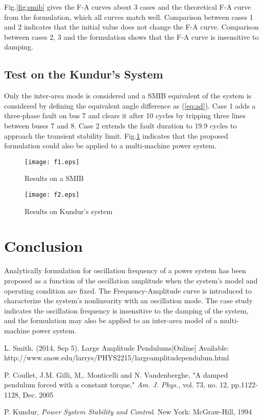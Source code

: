 \documentclass[journal]{IEEEtran}
\begin{document}
Fig.\ref{fig:smib} gives the F-A curves about 3 cases and the theoretical F-A curve from the formulation, which all curves match well. Comparison between cases 1 and 2 indicates that the initial value does not change the F-A curve. Comparison between cases 2, 3 and the formulation shows that the F-A curve is insensitive to damping.

\subsection{Test on the Kundur's System}
Only the inter-area mode is considered and a SMIB equivalent of the system is considered by defining the equivalent angle difference as (\ref{eq:ad}). Case 1 adds a three-phase fault on bus 7 and clears it after 10 cycles by tripping three lines between buses 7 and 8. Case 2 extends the fault duration to 19.9 cycles to approach the transient stability limit. Fig.\ref{fig:kundur} indicates that the proposed formulation could also be applied to a multi-machine power system.

\begin{figure}[htbp]
\begin{minipage}[t]{0.49\linewidth}
\raggedleft
\texttt{[image: f1.eps]}
\caption{Results on a SMIB} \label{fig:smib}
\end{minipage}
\begin{minipage}[t]{0.49\linewidth}
\raggedright
\texttt{[image: f2.eps]}
\caption{Results on Kundur's system} \label{fig:kundur}
\end{minipage}
\end{figure}

\section{Conclusion}
Analytically formulation for oscillation frequency of a power system has been proposed as a function of the oscillation amplitude when the system's model and operating condition are fixed. The Frequency-Amplitude curve is introduced to characterize the system's nonlinearity with an oscillation mode. The case study indicates the oscillation frequency is insensitive to the damping of the system, and the formulation may also be applied to an inter-area model of a multi-machine power system.


\begin{thebibliography}{99}
  L. Smith. (2014, Sep 5). Large Amplitude Pendulums[Online] Available:  http://www.snow.edu/larrys/PHYS2215/largeamplitudependulum.html

 P. Coullet, J.M. Gilli, M,. Monticelli and N. Vandenberghe, "A damped pendulum forced with a constant torque,"
\emph{Am. J. Phys.}, vol. 73, no. 12, pp.1122-1128, Dec. 2005

 P. Kundur,
\emph{Power System Stability and Control}. New York: McGraw-Hill, 1994

\end{thebibliography}
\end{document}
